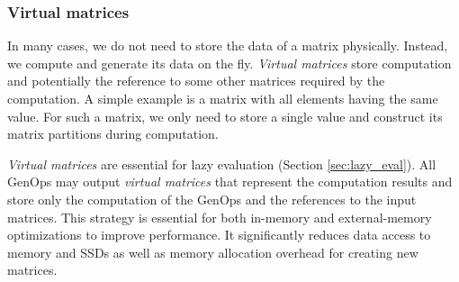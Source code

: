 
\subsubsection{Virtual matrices} \label{virt_mat}
In many cases, we do not need to store the data of a matrix physically. Instead,
we compute and generate its data on the fly. \textit{Virtual matrices} store
computation and potentially the reference
to some other matrices required by the computation. A simple example is a matrix
with all elements having the same value. For such a matrix, we only need to store
a single value and construct its matrix partitions during computation.

\textit{Virtual matrices} are essential for lazy evaluation (Section
\ref{sec:lazy_eval}). All GenOps may output \textit{virtual matrices} that
represent the computation results and store only the computation of the GenOps
and the references to the input matrices. This strategy is
essential for both in-memory and external-memory optimizations to improve
performance. It significantly reduces data access to memory and SSDs as well as
memory allocation overhead for creating new matrices.


